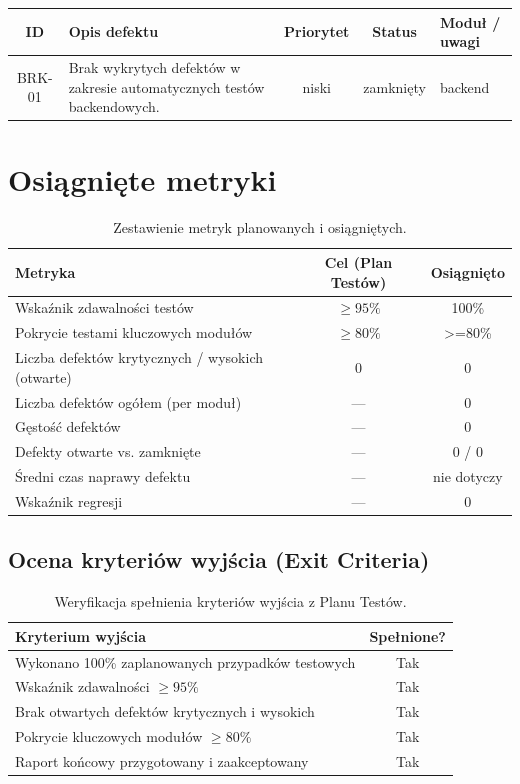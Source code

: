\documentclass[11pt,a4paper]{article}
\begin{document}
\begin{longtable}{c p{} c c p{}}
\toprule
\textbf{ID} & \textbf{Opis defektu} & \textbf{Priorytet} & \textbf{Status} & \textbf{Moduł / uwagi} \\
\midrule
\endhead
BRK-01 & Brak wykrytych defektów w zakresie automatycznych testów backendowych. & niski & zamknięty & backend \\
\bottomrule
\end{longtable}


\section{Osiągnięte metryki}

\begin{table}[h]
\centering
\begin{tabularx}{\textwidth}{Y c c}
\toprule
\textbf{Metryka} & \textbf{Cel (Plan Testów)} & \textbf{Osiągnięto} \\
\midrule
Wskaźnik zdawalności testów & $\geq 95\%$ & 100\% \\
Pokrycie testami kluczowych modułów & $\geq 80\%$ & \textgreater=80\% \\
Liczba defektów krytycznych / wysokich (otwarte) & $0$ & 0 \\
Liczba defektów ogółem (per moduł) & --- & 0 \\
Gęstość defektów & --- & 0 \\
Defekty otwarte vs. zamknięte & --- & 0 / 0 \\
Średni czas naprawy defektu & --- & nie dotyczy \\
Wskaźnik regresji & --- & 0 \\
\bottomrule
\end{tabularx}
\caption{Zestawienie metryk planowanych i osiągniętych.}
\end{table}

\subsection{Ocena kryteriów wyjścia (Exit Criteria)}
\begin{table}[h]
\centering
\begin{tabularx}{\textwidth}{Y c}
\toprule
\textbf{Kryterium wyjścia} & \textbf{Spełnione?} \\
\midrule
Wykonano 100\% zaplanowanych przypadków testowych & Tak \\
Wskaźnik zdawalności $\geq 95\%$ & Tak \\
Brak otwartych defektów krytycznych i wysokich & Tak \\
Pokrycie kluczowych modułów $\geq 80\%$ & Tak \\
Raport końcowy przygotowany i zaakceptowany & Tak \\
\bottomrule
\end{tabularx}
\caption{Weryfikacja spełnienia kryteriów wyjścia z Planu Testów.}
\end{table}
\end{document}
